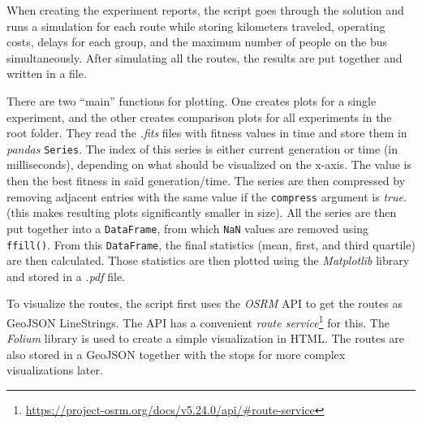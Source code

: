 When creating the experiment reports, the script goes through the solution and runs a simulation for each route while storing kilometers traveled, operating costs, delays for each group, and the maximum number of people on the bus simultaneously. After simulating all the routes, the results are put together and written in a file.

There are two ``main'' functions for plotting. One creates plots for a single experiment, and the other creates comparison plots for all experiments in the root folder. They read the \textit{.fits} files with fitness values in time and store them in \textit{pandas} \texttt{Series}. The index of this series is either current generation or time (in milliseconds), depending on what should be visualized on the x-axis. The value is then the best fitness in said generation/time. The series are then compressed by removing adjacent entries with the same value if the \texttt{compress} argument is \textit{true}. (this makes resulting plots significantly smaller in size). All the series are then put together into a \texttt{DataFrame}, from which \texttt{NaN} values are removed using \texttt{ffill()}. From this \texttt{DataFrame}, the final statistics (mean, first, and third quartile) are then calculated. Those statistics are then plotted using the \textit{Matplotlib} library and stored in a \textit{.pdf} file.

To visualize the routes, the script first uses the \textit{OSRM} API to get the routes as GeoJSON LineStrings. The API has a convenient \textit{route service}\footnote{\url{https://project-osrm.org/docs/v5.24.0/api/\#route-service}} for this. The \textit{Folium} library is used to create a simple visualization in HTML. The routes are also stored in a GeoJSON together with the stops for more complex visualizations later.